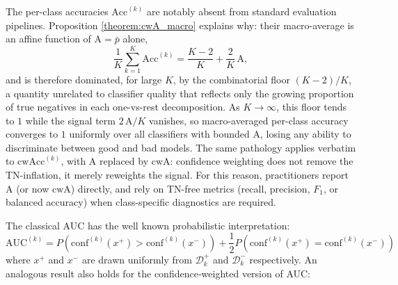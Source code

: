 \documentclass{article}
\theoremstyle{plain}
\theoremstyle{definition}
\theoremstyle{remark}
\begin{document}
The per-class accuracies $\text{Acc}^{(k)}$ are notably absent from standard evaluation pipelines. Proposition \ref{theorem:cwA_macro} explains why: their macro-average is an affine function of $\text{A} = \bar{p}$ alone, \[
\frac{1}{K}\sum_{k=1}^K \text{Acc}^{(k)} = \frac{K-2}{K} + \frac{2}{K}\,\text{A}, 
\] and is therefore dominated, for large $K$, by the combinatorial floor $(K-2)/K$, a quantity unrelated to classifier quality that reflects only the growing proportion of true negatives in each one-vs-rest decomposition. As $K\to\infty$, this floor tends to $1$ while the signal term $2\,\text{A}/K$ vanishes, so macro-averaged per-class accuracy converges to $1$ uniformly over all classifiers with bounded $\text{A}$, losing any ability to discriminate between good and bad models. The same pathology applies verbatim to $\text{cwAcc}^{(k)}$, with $\text{A}$ replaced by $\text{cwA}$: confidence weighting does not remove the TN-inflation, it merely reweights the signal. For this reason, practitioners report $\text{A}$ (or now $\text{cwA}$) directly, and rely on TN-free metrics (recall, precision, $F_1$, or balanced accuracy) when class-specific diagnostics are required.
\bigskip

The classical AUC has the well known probabilistic interpretation:  \begin{equation}  \label{auc_equation_appendix}
\text{AUC}^{(k)} =  P\left(\text{conf}^{(k)}(x^+) > \text{conf}^{(k)}(x^-)\right) + \frac{1}{2}P\left(\text{conf}^{(k)}(x^+) = \text{conf}^{(k)}(x^-)\right)
\end{equation}
where $x^+$ and $x^-$ are drawn uniformly from $\mathcal{D}^+_k$ and $\mathcal{D}^-_k$ respectively. An analogous result also holds for the confidence‑weighted version of AUC:
\smallskip
\end{document}
